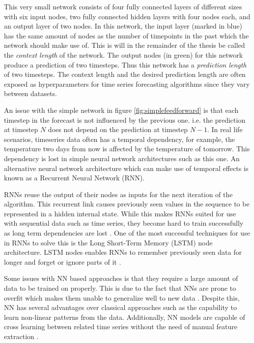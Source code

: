 This very small network consists of four fully connected layers of different sizes with six input nodes, two fully connected hidden layers with four nodes each, and an output layer of two nodes. In this network, the input layer (marked in blue) has the same amount of nodes as the number of timepoints in the past which the network should make use of. This is will in the remainder of the thesis be called the \textit{context length} of the network. The output nodes (in green) for this network produce a prediction of two timesteps. Thus this network has a \textit{prediction length} of two timesteps. The context length and the desired prediction length are often exposed as hyperparameters for time series forecasting algorithms since they vary between datasets.

An issue with the simple network in figure \ref{fig:simplefeedforward} is that each timestep in the forecast is not influenced by the previous one. i.e. the prediction at timestep \(N\) does not depend on the prediction at timestep \(N-1\). In real life scenarios, timeseries data often has a temporal dependency, for example, the temperature two days from now is affected by the temperature of tomorrow. This dependency is lost in simple neural network architectures such as this one. An alternative neural network architecture which can make use of temporal effects is known as a Recurrent Neural Network (RNN).

RNNs reuse the output of their nodes as inputs for the next iteration of the algorithm. This recurrent link causes previously seen values in the sequence to be represented in a hidden internal state. While this makes RNNs suited for use with sequential data such as time series, they become hard to train successfully as long term dependencies are lost \cite{bengio1994learning}. One of the most successful techniques for use in RNNs to solve this is the Long Short-Term Memory (LSTM) node architecture. LSTM nodes enables RNNs to remember previously seen data for longer and forget or ignore parts of it \cite{sherstinsky_fundamentals_2020}.

Some issues with NN based approaches is that they require a large amount of data to be trained on properly. This is due to the fact that NNs are prone to overfit which makes them unable to generalize well to new data \cite{srivastava_dropout_2014}. Despite this, NN has several advantages over classical approaches such as the capability to learn non-linear patterns from the data. Additionally, NN models are capable of cross learning between related time series without the need of manual feature extraction \cite{smyl_hybrid_2020}.


